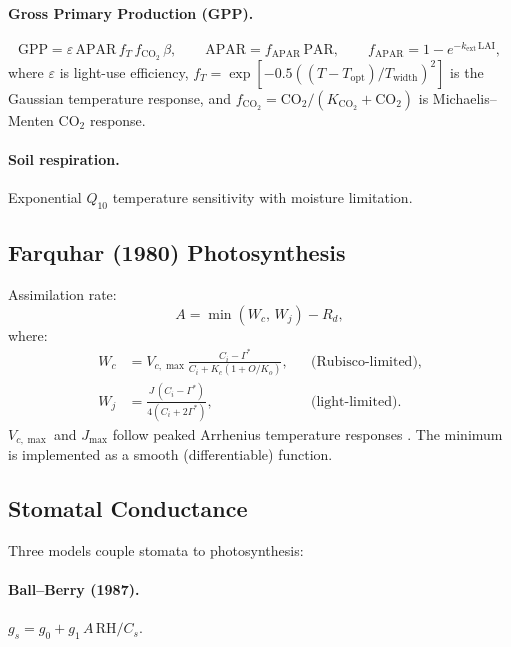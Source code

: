 \documentclass[11pt,twoside]{report}
\begin{document}
\paragraph{Gross Primary Production (GPP).}
\begin{equation}
  \mathrm{GPP} = \varepsilon\,\mathrm{APAR}\,f_T\,f_{\mathrm{CO}_2}\,\beta,
  \qquad \mathrm{APAR} = f_{\mathrm{APAR}}\,\mathrm{PAR},
  \qquad f_{\mathrm{APAR}} = 1-e^{-k_{\mathrm{ext}}\,\mathrm{LAI}},
\end{equation}
where $\varepsilon$ is light-use efficiency, $f_T=\exp[-0.5((T-T_{\mathrm{opt}})/T_{\mathrm{width}})^2]$
is the Gaussian temperature response, and
$f_{\mathrm{CO}_2}=\mathrm{CO}_2/(K_{\mathrm{CO}_2}+\mathrm{CO}_2)$
is Michaelis--Menten CO$_2$ response.

\paragraph{Soil respiration.}
Exponential $Q_{10}$ temperature sensitivity with moisture limitation.

\subsection{Farquhar (1980) Photosynthesis}

Assimilation rate:
\begin{equation}
  A = \min(W_c,\, W_j) - R_d,
\end{equation}
where:
\begin{align}
  W_c &= V_{c,\max}\frac{C_i - \Gamma^*}{C_i + K_c(1+O/K_o)},
  & &\text{(Rubisco-limited)}, \\
  W_j &= \frac{J\,(C_i - \Gamma^*)}{4(C_i + 2\Gamma^*)},
  & &\text{(light-limited)}.
\end{align}
$V_{c,\max}$ and $J_{\max}$ follow peaked Arrhenius temperature responses
\citep{Bernacchi2001}.  The minimum is implemented as a smooth (differentiable)
function.

\subsection{Stomatal Conductance}

Three models couple stomata to photosynthesis:

\paragraph{Ball--Berry (1987).}
$g_s = g_0 + g_1\,A\,\mathrm{RH}/C_s$.
\end{document}
